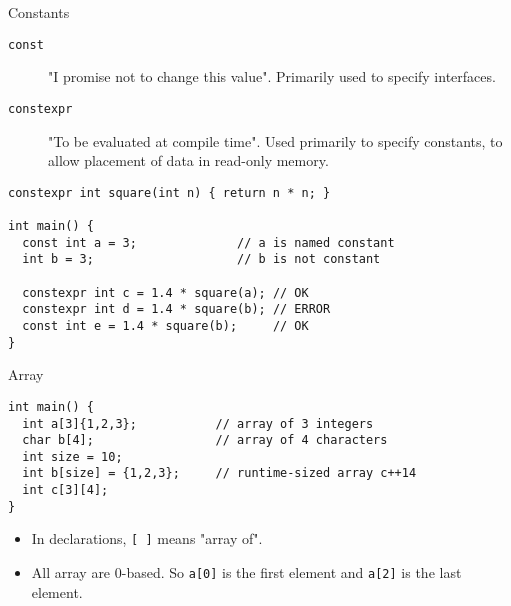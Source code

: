 \documentclass[presentation]{beamer}
\begin{document}
\begin{frame}[fragile,label={sec:orgheadline24}]{Constants}
 \begin{description}
\item[{\texttt{const}}] "I promise not to change this value".  Primarily used
to specify interfaces.
\item[{\texttt{constexpr}}] "To be evaluated at compile time".  Used primarily
to specify constants, to allow placement of data in read-only
memory.
\end{description}


\begin{verbatim}
constexpr int square(int n) { return n * n; }

int main() {
  const int a = 3;              // a is named constant
  int b = 3;                    // b is not constant

  constexpr int c = 1.4 * square(a); // OK
  constexpr int d = 1.4 * square(b); // ERROR
  const int e = 1.4 * square(b);     // OK
}
\end{verbatim}
\end{frame}

\begin{frame}[fragile,label={sec:orgheadline25}]{Array}
 \begin{verbatim}
int main() {
  int a[3]{1,2,3};           // array of 3 integers
  char b[4];                 // array of 4 characters
  int size = 10;
  int b[size] = {1,2,3};     // runtime-sized array c++14
  int c[3][4];
}
\end{verbatim}

\begin{itemize}
\item In declarations, \texttt{[ ]} means "array of".
\item All array are 0-based.  So \texttt{a[0]} is the first element and \texttt{a[2]}
     is the last element.
\end{itemize}
\end{frame}
\end{document}
